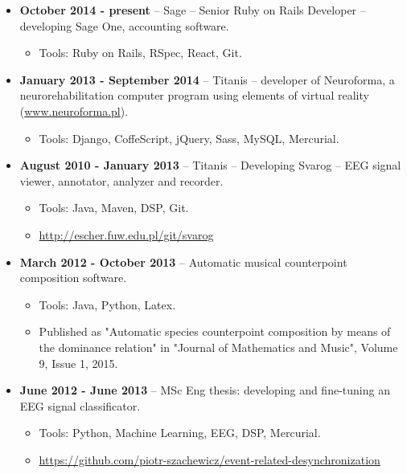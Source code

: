 \documentclass[10pt]{article}
\newenvironment{outerlist}[1][\enskip\textbullet]%
        {\begin{itemize}[#1]}{\end{itemize}%
         \vspace{-.6\baselineskip}}
\begin{document}
\begin{outerlist}

\item[] \textbf{October 2014 - present} -- Sage -- Senior Ruby on Rails Developer -- developing Sage One, accounting software.
\begin{itemize}
  \item Tools: Ruby on Rails, RSpec, React, Git.
\end{itemize}

\item[] \textbf{January 2013 - September 2014} -- Titanis -- developer of Neuroforma, a neurorehabilitation computer program using elements of virtual reality (\url{www.neuroforma.pl}).
\begin{itemize}
  \item Tools: Django, CoffeScript, jQuery, Sass, MySQL, Mercurial.
\end{itemize}

\item[] \textbf{August 2010 - January 2013} -- Titanis -- Developing Svarog -- EEG signal viewer, annotator, analyzer and recorder.
\begin{itemize}
  \item Tools: Java, Maven, DSP, Git.
  \item \url{http://escher.fuw.edu.pl/git/svarog}
\end{itemize}

\item[] \textbf{March 2012 - October 2013} -- Automatic musical counterpoint composition software.
\begin{itemize}
  \item Tools: Java, Python, Latex.
  \item Published as "Automatic species counterpoint composition by means of the dominance relation" in
  "Journal of Mathematics and Music", Volume 9, Issue 1, 2015.
\end{itemize}

\item[] \textbf{June 2012 - June 2013} -- MSc Eng thesis: developing and fine-tuning an EEG signal classificator.
\begin{itemize}
  \item Tools: Python, Machine Learning, EEG, DSP, Mercurial.
  \item \url{https://github.com/piotr-szachewicz/event-related-desynchronization}
\end{itemize}

\pagebreak


\end{outerlist}
\end{document}
